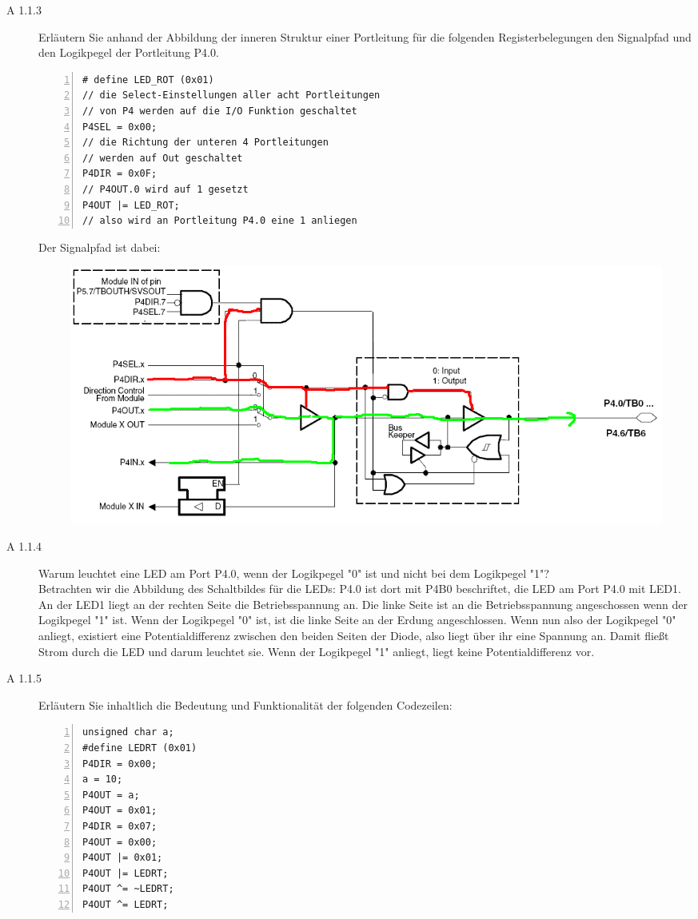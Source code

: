 \documentclass[11pt,a4paper,ngerman]{article}
\begin{document}
\begin{description}
	\newpage
	\item[A 1.1.3] Erläutern Sie anhand der Abbildung der inneren Struktur einer Portleitung für die folgenden Registerbelegungen den Signalpfad und den Logikpegel der Portleitung P4.0. 
		\begin{lstlisting}[numbers=left]
# define LED_ROT (0x01)
// die Select-Einstellungen aller acht Portleitungen
// von P4 werden auf die I/O Funktion geschaltet
P4SEL = 0x00;
// die Richtung der unteren 4 Portleitungen 
// werden auf Out geschaltet
P4DIR = 0x0F;
// P4OUT.0 wird auf 1 gesetzt
P4OUT |= LED_ROT;
// also wird an Portleitung P4.0 eine 1 anliegen
		\end{lstlisting}
		
		Der Signalpfad ist dabei:
		\begin{figure}[h!]
			\includegraphics[scale=0.4]{0401011.png}
		\end{figure}	
	\item[A 1.1.4] Warum leuchtet eine LED am Port P4.0, wenn der Logikpegel "0" ist und nicht bei dem Logikpegel "1"? \\
	
		Betrachten wir die Abbildung des Schaltbildes für die LEDs: P4.0 ist dort mit P4B0 beschriftet, die LED am Port P4.0 mit LED1. An der LED1 liegt an der rechten Seite die Betriebsspannung an. Die linke Seite ist an die Betriebsspannung angeschossen	wenn der Logikpegel "1" ist. Wenn der Logikpegel "0" ist, ist die linke Seite an der Erdung angeschlossen. Wenn nun also der Logikpegel "0" anliegt, existiert eine Potentialdifferenz zwischen den beiden Seiten der Diode, also liegt über ihr eine Spannung an. Damit fließt Strom durch die LED und darum leuchtet sie. Wenn der Logikpegel "1" anliegt, liegt keine
	Potentialdifferenz vor.


	\item[A 1.1.5] Erläutern Sie inhaltlich die Bedeutung und Funktionalität der folgenden Codezeilen: \\
		\begin{lstlisting}[numbers=left]
unsigned char a;
#define LEDRT (0x01)
P4DIR = 0x00;
a = 10;
P4OUT = a;
P4OUT = 0x01;
P4DIR = 0x07;
P4OUT = 0x00;
P4OUT |= 0x01;
P4OUT |= LEDRT;
P4OUT ^= ~LEDRT;
P4OUT ^= LEDRT;
		\end{lstlisting}
		

\end{description}
\end{document}
